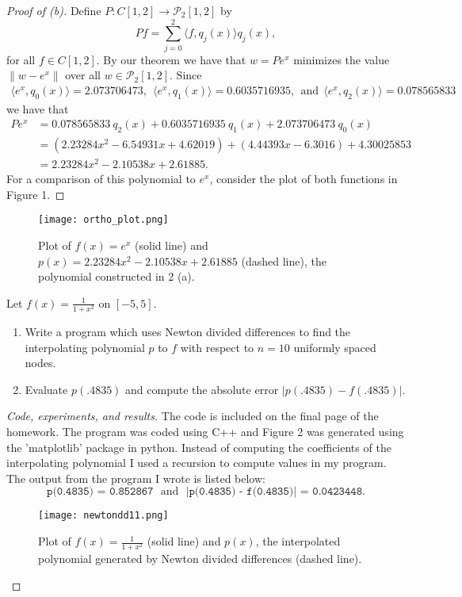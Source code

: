 \documentclass[8pt]{article}
\theoremstyle{definition}
\newenvironment{exercise}[1]
  {\renewcommand\theinnerexercise{#1}\innerexercise}
  {\endinnerexercise}
\begin{document}
\begin{proof}[Proof of (b)]
Define $P : C [1, 2] \to \mathcal{P}_2 [1, 2]$ by $$P f = \sum_{j = 0}^{2} \langle f, q_j (x) \rangle q_j (x),$$ for all $f \in C [1, 2]$. By our theorem we have that $w = P e^{x}$ minimizes the value $\| w - e^{x} \|$ over all $w \in \mathcal{P}_2 [1, 2]$. Since 
\begin{align*}
\langle e^x, q_0 (x) \rangle = 2.073706473, \ \ \langle e^x, q_1 (x) \rangle = 0.6035716935, \ \ \text{and} \ \ \langle e^x, q_2 (x) \rangle = 0.078565833
\end{align*}
we have that 
\begin{align*}
P e^{x} &= 0.078565833 \ q_2 (x) + 0.6035716935 \ q_1 (x) + 2.073706473 \ q_0 (x) \\
&= (2.23284 x^2 - 6.54931 x + 4.62019) + (4.44393 x - 6.3016) + 4.30025853 \\
&= 2.23284 x^2 - 2.10538 x + 2.61885.
\end{align*}
For a comparison of this polynomial to $e^x$, consider the plot of both functions in Figure 1.
\end{proof}
\begin{figure}[H]
	\texttt{[image: ortho\_plot.png]}
	\vspace{-10mm}
	\caption{Plot of $f(x) = e^x$ (solid line) and $p(x) = 2.23284 x^2 - 2.10538 x + 2.61885$ (dashed line), the polynomial constructed in 2 (a).}
	\label{Figure 1}
\end{figure}


\begin{exercise}{3}
Let $f(x) = \frac{1}{1 + x^2}$ on $[-5, 5]$.
\begin{enumerate}
	\item[(a)] Write a program which uses Newton divided differences to find the interpolating polynomial $p$ to $f$ with respect to $n = 10$ uniformly spaced nodes.
	\item[(b)] Evaluate $p(.4835)$ and compute the absolute error $| p(.4835) - f(.4835)|$.
\end{enumerate}
\end{exercise}

\begin{proof}[Code, experiments, and results]
The code is included on the final page of the homework. The program was coded using C++ and Figure 2 was generated using the 'matplotlib' package in python. Instead of computing the coefficients of the interpolating polynomial I used a recursion to compute values in my program. The output from the program I wrote is listed below: $$\texttt{p(0.4835) = 0.852867} \ \ \ \text{and} \ \ \ \texttt{|p(0.4835) - f(0.4835)| = 0.0423448}.$$

\begin{figure}[H]
	\texttt{[image: newtondd11.png]}
	\vspace{-10mm}
	\caption{Plot of $f(x) = \frac{1}{1 + x^2}$ (solid line) and $p(x)$, the interpolated polynomial generated by Newton divided differences (dashed line).}
	\label{Figure 2}
\end{figure}
\end{proof}
\end{document}
